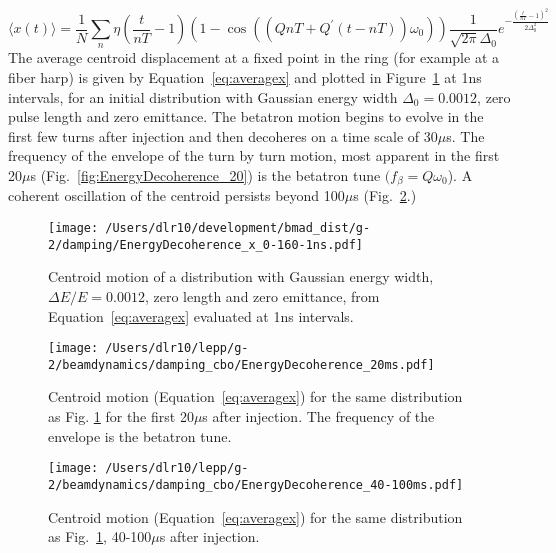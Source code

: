 \documentclass[10pt]{article}
\begin{document}
\begin{equation}
\langle x(t)\rangle = \frac{1}{N}
\sum_n\eta(\frac{t}{nT}-1)\left(1-\cos\left((QnT+ Q^\prime(t-nT))\omega_0 \right)\right)\frac{1}{\sqrt{2\pi}\Delta_0}e^{-\frac{(\frac{t}{nT}-1)^2}{2\Delta_0^2}}\label{eq:averagex}
\end{equation}
The average centroid displacement at a fixed point in the ring (for example at a fiber harp) is given by Equation~\ref{eq:averagex} and 
plotted in Figure~\ref{fig:EnergyDecoherence_160ms} at 1ns intervals, for an initial distribution with Gaussian energy width $\Delta_0=0.0012$, 
zero pulse length and zero emittance. The betatron motion begins to evolve in the first few turns after injection and then decoheres on a time scale of 30$\mu$s.
The frequency of the envelope of the turn by turn motion, most apparent in the first 20$\mu$s (Fig.~\ref{fig:EnergyDecoherence_20}) 
is the betatron tune $(f_\beta = Q\omega_0$).   
A coherent oscillation of the centroid persists beyond 100$\mu$s (Fig.~\ref{fig:EnergyDecoherence_40-100}.)
\begin{figure}[htbp]
\centering
   \texttt{[image: /Users/dlr10/development/bmad\_dist/g-2/damping/EnergyDecoherence\_x\_0-160-1ns.pdf]} 
\caption{Centroid motion of a distribution with Gaussian energy width, $\Delta E/E=0.0012$, zero length and zero emittance,
 from Equation~\ref{eq:averagex} evaluated at 1ns intervals. 
   \label{fig:EnergyDecoherence_160ms}}
\end{figure}

\begin{figure}[htbp] %
\begin{minipage}[t]{0.48\textwidth}
   \centering
   \texttt{[image: /Users/dlr10/lepp/g-2/beamdynamics/damping\_cbo/EnergyDecoherence\_20ms.pdf]} 
   \caption{Centroid motion (Equation~\ref{eq:averagex}) for the same distribution as Fig. \ref{fig:EnergyDecoherence_160ms}
 for the first 20$\mu$s after injection. The
frequency of the envelope is the betatron tune. \label{fig:EnergyDecoherence_20}}
 \end{minipage}
\hfill
\begin{minipage}[t]{0.48\textwidth}
\centering
   \texttt{[image: /Users/dlr10/lepp/g-2/beamdynamics/damping\_cbo/EnergyDecoherence\_40-100ms.pdf]} 
\caption{Centroid motion (Equation~\ref{eq:averagex}) for the same distribution as Fig.~\ref{fig:EnergyDecoherence_160ms}, 40-100$\mu$s after injection.
   \label{fig:EnergyDecoherence_40-100}}
\end{minipage}
\end{figure}
%
\end{document}

